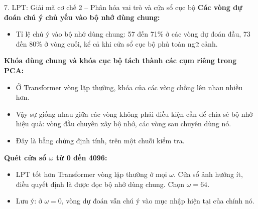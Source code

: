 \begin{frame}{7. LPT: Giải mã cơ chế 2 -- Phân hóa vai trò và cửa sổ cục bộ}
    \textbf{Các vòng dự đoán chú ý chủ yếu vào bộ nhớ dùng chung:}
    \begin{itemize}
        \item Tỉ lệ chú ý vào bộ nhớ dùng chung: 57 đến 71\% ở các vòng dự đoán đầu, 73 đến 80\% ở vòng cuối, kể cả khi cửa sổ cục bộ phủ toàn ngữ cảnh.
    \end{itemize}
    \vspace{0.1cm}
    \textbf{Khóa dùng chung và khóa cục bộ tách thành các cụm riêng trong PCA:}
    \begin{itemize}
        \item Ở Transformer vòng lặp thường, khóa của các vòng chồng lên nhau nhiều hơn.
        \item Vậy sự giống nhau giữa các vòng không phải điều kiện cần để chia sẻ bộ nhớ hiệu quả: vòng đầu chuyên xây bộ nhớ, các vòng sau chuyên dùng nó.
        \item Đây là bằng chứng định tính, trên một chuỗi kiểm tra.
    \end{itemize}
    \vspace{0.1cm}
    \textbf{Quét cửa sổ $\omega$ từ 0 đến 4096:}
    \begin{itemize}
        \item LPT tốt hơn Transformer vòng lặp thường ở mọi $\omega$. Cửa sổ ảnh hưởng ít, điều quyết định là được đọc bộ nhớ dùng chung. Chọn $\omega = 64$.
        \item Lưu ý: ở $\omega = 0$, vòng dự đoán vẫn chú ý vào mục nhập hiện tại của chính nó.
    \end{itemize}
\end{frame}

